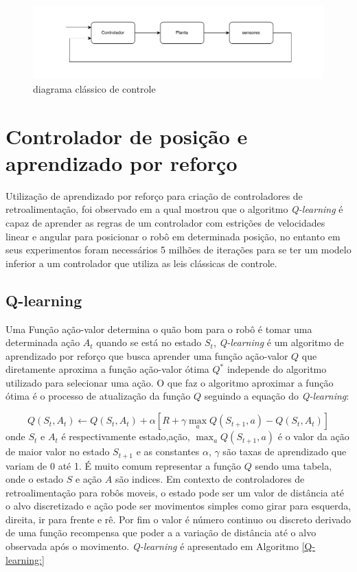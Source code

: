 \begin{figure}[H]
    \centering
    \includegraphics[scale=0.6]{figuras/sistema_classico_controle.pdf}
    \caption{diagrama clássico de controle}
\end{figure}

\section{Controlador de posição e aprendizado por reforço }

Utilização de aprendizado por reforço para criação de controladores
de retroalimentação, foi observado em \cite{farias2020position}
a qual mostrou que o algoritmo \textit{Q-learning} é capaz de aprender
as regras de um controlador com estrições de velocidades linear e angular
para  posicionar o robô em determinada posição, no entanto em seus
experimentos foram necessários 5 milhões de iterações para se ter um modelo
inferior a um controlador que utiliza as leis clássicas de controle.

\subsection{Q-learning}
Uma Função ação-valor determina o quão bom 
para o robô é tomar uma determinada ação $A_t$ quando se está no estado
$S_t$, \textit{Q-learning} é um algoritmo de aprendizado por reforço que
busca aprender uma função ação-valor $Q$ que diretamente aproxima
a função ação-valor ótima $Q^*$ independe do algoritmo utilizado
para selecionar uma ação. O que faz o algoritmo aproximar a função ótima
é o processo de atualização da função $Q$ seguindo a equação do \textit{Q-learning}:

\begin{equation} 
    Q(S_t,A_t) \leftarrow Q(S_t,A_t) + \alpha[R + \gamma  \max_aQ(S_{t +1},a) - Q(S_t,A_t)]
\end{equation}
onde $S_t$ e $A_t$ é respectivamente estado,ação, $\max_aQ(S_{t +1},a)$ é o valor da
ação de maior valor no estado $S_{t+1}$ e as constantes $\alpha$, $\gamma$ são taxas
de aprendizado que variam de 0 até 1. É muito comum representar a função $Q$
sendo uma tabela, onde o estado $S$ e ação $A$ são indices. Em contexto de
controladores de retroalimentação para robôs moveis, o estado pode ser um
valor de distância até o alvo discretizado e ação pode ser movimentos simples
como girar para esquerda, direita, ir para frente e rê. Por fim o valor é
número continuo ou discreto derivado de uma função recompensa que poder
a a variação de distância até o alvo observada após o movimento.
\textit{Q-learning} é apresentado em Algoritmo  \ref{Q-learning:}



